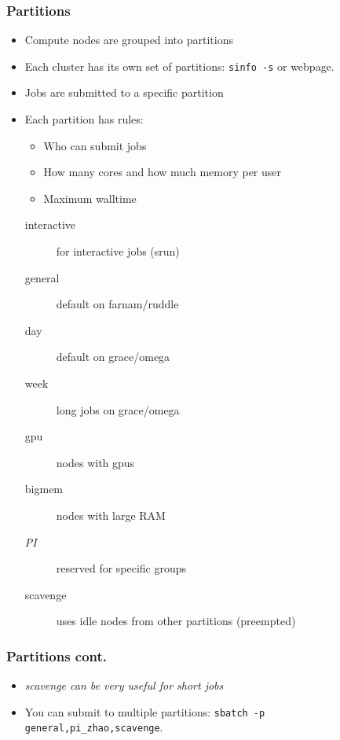 \documentclass[10pt]{beamer}
\begin{document}
\begin{frame}[fragile]
\frametitle{Partitions}
\begin{itemize}
\item Compute nodes are grouped into partitions
\item Each cluster has its own set of partitions: \verb+sinfo -s+ or webpage.
\item Jobs are submitted to a specific partition
\item Each partition has rules:
\begin{itemize}
\item Who can submit jobs
\item How many cores and how much memory per user
\item Maximum walltime
\end{itemize}
\begin{description}
\item [interactive] for interactive jobs (srun)
\item [general] default on farnam/ruddle
\item [day] default on grace/omega
\item [week] long jobs on grace/omega
\item [gpu] nodes with gpus
\item [bigmem] nodes with large RAM
\item [\textit{PI}] reserved for specific groups
\item [scavenge] uses idle nodes from other partitions (preempted)
\end{description}
\end{itemize}

\end{frame}

\begin{frame}[fragile]
\frametitle{Partitions cont.}
\begin{itemize}
\item \em{scavenge} can be very useful for short jobs
\item You can submit to multiple partitions: 
\verb+sbatch -p general,pi_zhao,scavenge+.

\end{itemize}

\end{frame}
\end{document}
